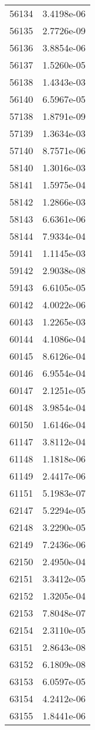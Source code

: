 \begin{table}[h!]
\begin{tabular}{|| c || c |}
56134 & 3.4198e-06 \\
56135 & 2.7726e-09 \\
56136 & 3.8854e-06 \\
56137 & 1.5260e-05 \\
56138 & 1.4343e-03 \\
56140 & 6.5967e-05 \\
57138 & 1.8791e-09 \\
57139 & 1.3634e-03 \\
57140 & 8.7571e-06 \\
58140 & 1.3016e-03 \\
58141 & 1.5975e-04 \\
58142 & 1.2866e-03 \\
58143 & 6.6361e-06 \\
58144 & 7.9334e-04 \\
59141 & 1.1145e-03 \\
59142 & 2.9038e-08 \\
59143 & 6.6105e-05 \\
60142 & 4.0022e-06 \\
60143 & 1.2265e-03 \\
60144 & 4.1086e-04 \\
60145 & 8.6126e-04 \\
60146 & 6.9554e-04 \\
60147 & 2.1251e-05 \\
60148 & 3.9854e-04 \\
60150 & 1.6146e-04 \\
61147 & 3.8112e-04 \\
61148 & 1.1818e-06 \\
61149 & 2.4417e-06 \\
61151 & 5.1983e-07 \\
62147 & 5.2294e-05 \\
62148 & 3.2290e-05 \\
62149 & 7.2436e-06 \\
62150 & 2.4950e-04 \\
62151 & 3.3412e-05 \\
62152 & 1.3205e-04 \\
62153 & 7.8048e-07 \\
62154 & 2.3110e-05 \\
63151 & 2.8643e-08 \\
63152 & 6.1809e-08 \\
63153 & 6.0597e-05 \\
63154 & 4.2412e-06 \\
63155 & 1.8441e-06 \\

\end{tabular}
\end{table}
